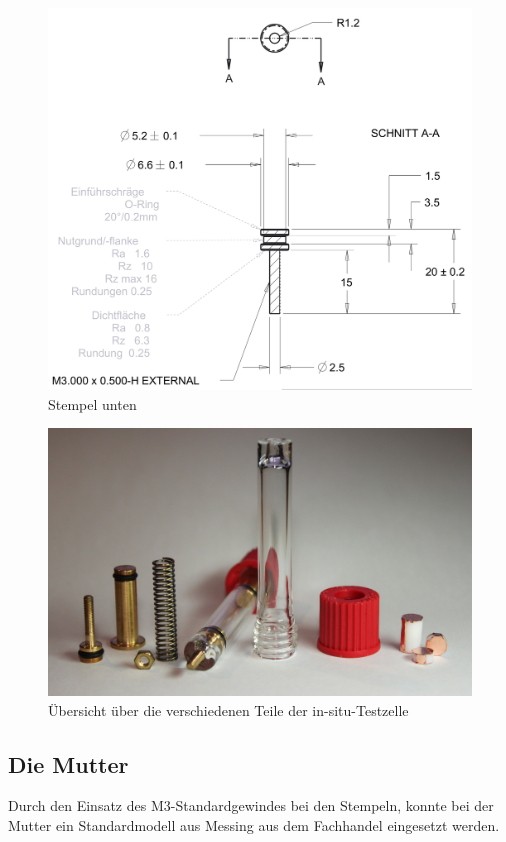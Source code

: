 \documentclass[a4paper, 11pt, headsepline,footsepline,twoside,abstract]{scrbook}
\begin{document}
\begin{figure}
	\centering
	\includegraphics[width=0.7\columnwidth]{images/stempel_unten.png}
	\caption{Stempel unten}
	\label{stempel_unten}
\end{figure}
\begin{figure}
	\centering
	\includegraphics[width=1.0\columnwidth]{images/uebersicht_testzelle.jpg}
	\caption{Übersicht über die verschiedenen Teile der in-situ-Testzelle} %
	\label{uebersicht_teile}
\end{figure}
\subsection{Die Mutter}
Durch den Einsatz des M3-Standardgewindes bei den Stempeln, konnte bei der Mutter ein Standardmodell aus Messing aus dem Fachhandel eingesetzt werden.
\end{document}
